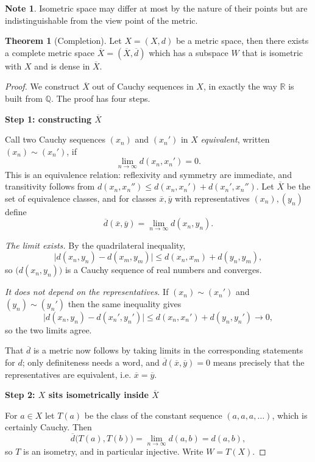 \documentclass[11pt,a4paper]{article}
\theoremstyle{definition}
\newtheorem{thm}{Theorem}[section]
\newtheorem*{note}{Note}
\newcommand{\subhead}[1]{%
  \par\medskip\noindent\textbf{#1}\par\nobreak\smallskip}
\begin{document}
\begin{note}
Isometric space may differ at most by the nature of their points but are indistinguishable from the view point of the metric.

\end{note}


\begin{thm}[Completion]
Let $X=(X,d)$ be a metric space, then there exists a complete metric space $\overline{X}=(\overline{X},\overline{d})$ which has a subspace $W$ that is isometric with $X$ and is dense in $\overline{X}$.

\end{thm}
\begin{proof}
We construct $\overline{X}$ out of Cauchy sequences in $X$, in exactly the way
$\mathbb{R}$ is built from $\mathbb{Q}$. The proof has four steps.

\subhead{Step 1: constructing $\overline{X}$}
Call two Cauchy sequences $(x_n)$ and $(x_n')$ in $X$ \emph{equivalent}, written
$(x_n)\sim(x_n')$, if
$$\lim_{n\rightarrow\infty}d(x_n,x_n')=0 .$$
This is an equivalence relation: reflexivity and symmetry are immediate, and
transitivity follows from $d(x_n,x_n'')\leq d(x_n,x_n')+d(x_n',x_n'')$. Let
$\overline{X}$ be the set of equivalence classes, and for classes
$\overline{x},\overline{y}$ with representatives $(x_n),(y_n)$ define
$$\overline{d}(\overline{x},\overline{y})=\lim_{n\rightarrow\infty}d(x_n,y_n).$$

\emph{The limit exists.} By the quadrilateral inequality,
$$\big|d(x_n,y_n)-d(x_m,y_m)\big|\leq d(x_n,x_m)+d(y_n,y_m),$$
so $\big(d(x_n,y_n)\big)$ is a Cauchy sequence of real numbers and converges.

\emph{It does not depend on the representatives.} If $(x_n)\sim(x_n')$ and
$(y_n)\sim(y_n')$ then the same inequality gives
$$\big|d(x_n,y_n)-d(x_n',y_n')\big|\leq d(x_n,x_n')+d(y_n,y_n')\rightarrow 0 ,$$
so the two limits agree.

That $\overline{d}$ is a metric now follows by taking limits in the
corresponding statements for $d$; only definiteness needs a word, and
$\overline{d}(\overline{x},\overline{y})=0$ means precisely that the
representatives are equivalent, i.e. $\overline{x}=\overline{y}$.

\subhead{Step 2: $X$ sits isometrically inside $\overline{X}$}
For $a\in X$ let $T(a)$ be the class of the constant sequence $(a,a,a,\dots)$,
which is certainly Cauchy. Then
$$\overline{d}\big(T(a),T(b)\big)=\lim_{n\rightarrow\infty}d(a,b)=d(a,b),$$
so $T$ is an isometry, and in particular injective. Write $W=T(X)$.


\end{proof}
\end{document}

